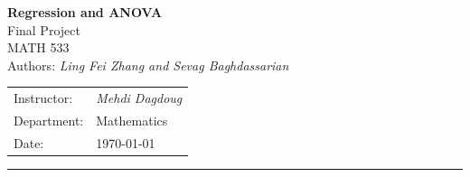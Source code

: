 \begin{titlepage}
    \noindent{}
    \vspace{40pt}
    \textcolor{UM_Brown}{
        \begin{flushleft}
            \textbf{\Huge Regression and ANOVA}\\
            \vspace{30pt}
            \Large Final Project \\
            \vspace{3pt}
            \Large MATH 533 \\
            \vspace{20pt}
            \large Authors: \textit{Ling Fei Zhang and Sevag Baghdassarian} \\
        \end{flushleft}
    }
    \vspace{180pt}
    \textcolor{UM_Brown}{
        \begin{flushright}
            \begin{tabular}{ll}
                Instructor: & \textit{Mehdi Dagdoug} \\
                Department: & Mathematics            \\
                Date:       & \today
            \end{tabular}
        \end{flushright}
        \hrule
    }
\end{titlepage}